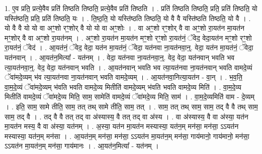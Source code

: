 \documentclass[17pt]{extarticle}
\begin{document}
1. ए॒व प्रति॒ प्रत्ये॒वैव प्रति॑ तिष्ठति तिष्ठति॒ प्रत्ये॒वैव प्रति॑ तिष्ठति । . प्रति॑ तिष्ठति तिष्ठति॒ प्रति॒ प्रति॑ तिष्ठति॒ यो यस्ति॑ष्ठति॒ प्रति॒ प्रति॑ तिष्ठति॒ यः । . ति॒ष्ठ॒ति॒ यो यस्ति॑ष्ठति तिष्ठति॒ यो वै वै यस्ति॑ष्ठति तिष्ठति॒ यो वै । . यो वै वै यो यो वा अꣳ॒॒शो रꣳ॒॒शोर् वै यो यो वा अꣳ॒॒शोः । . वा अꣳ॒॒शो रꣳ॒॒शोर् वै वा अꣳ॒॒शो रा॒यत॑न मा॒यत॑न मꣳ॒॒शोर् वै वा अꣳ॒॒शो रा॒यत॑नम् । . अꣳ॒॒शो रा॒यत॑न मा॒यत॑न मꣳ॒॒शो रꣳ॒॒शो रा॒यत॑नं॒ ॅवेद॒ वेदा॒यत॑न मꣳ॒॒शो रꣳ॒॒शो रा॒यत॑नं॒ ॅवेद॑ । . आ॒यत॑नं॒ ॅवेद॒ वेदा॒ यत॑न मा॒यत॑नं॒ ॅवेदा॒ यत॑नवा ना॒यत॑नवा॒न्॒. वेदा॒ यत॑न मा॒यत॑नं॒ ॅवेदा॒ यत॑नवान् । . आ॒यत॑न॒मित्या᳚ - यत॑नम् । . वेदा॒ यत॑नवा ना॒यत॑नवा॒न्॒. वेद॒ वेदा॒ यत॑नवान् भवति भव त्या॒यत॑नवा॒न्॒. वेद॒ वेदा॒ यत॑नवान् भवति । . आ॒यत॑नवान् भवति भव त्या॒यत॑नवा ना॒यत॑नवान् भवति वामदे॒व्यं ॅवा॑मदे॒व्यम् भ॑व त्या॒यत॑नवा ना॒यत॑नवान् भवति वामदे॒व्यम् । . आ॒यत॑नवा॒नित्या॒यत॑न - वा॒न् । . भ॒व॒ति॒ वा॒म॒दे॒व्यं ॅवा॑मदे॒व्यम् भ॑वति भवति वामदे॒व्य मितीति॑ वामदे॒व्यम् भ॑वति भवति वामदे॒व्य मिति॑ । . वा॒म॒दे॒व्य मितीति॑ वामदे॒व्यं ॅवा॑मदे॒व्य मिति॒ साम॒ सामेति॑ वामदे॒व्यं ॅवा॑मदे॒व्य मिति॒ साम॑ । . वा॒म॒दे॒व्यमिति॑ वाम - दे॒व्यम् । . इति॒ साम॒ सामे तीति॒ साम॒ तत् तथ् सामे तीति॒ साम॒ तत् । . साम॒ तत् तथ् साम॒ साम॒ तद् वै वै तथ् साम॒ साम॒ तद् वै । . तद् वै वै तत् तद् वा अ॑स्यास्य॒ वै तत् तद् वा अ॑स्य । . वा अ॑स्यास्य॒ वै वा अ॑स्या॒ यत॑न मा॒यत॑न मस्य॒ वै वा अ॑स्या॒ यत॑नम् । . अ॒स्या॒ यत॑न मा॒यत॑न मस्यास्या॒ यत॑न॒म् मन॑सा॒ मन॑सा॒ ऽऽयत॑न मस्यास्या॒ यत॑न॒म् मन॑सा । . आ॒यत॑न॒म् मन॑सा॒ मन॑सा॒ ऽऽयत॑न मा॒यत॑न॒म् मन॑सा॒ गाय॑मानो॒ गाय॑मानो॒ मन॑सा॒ ऽऽयत॑न मा॒यत॑न॒म् मन॑सा॒ गाय॑मानः । . आ॒यत॑न॒मित्या᳚ - यत॑नम् । \newline
\end{document}
